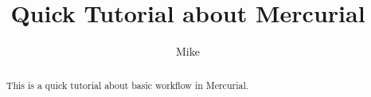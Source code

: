 \documentclass[a4paper,10pt,twocolumn]{article}
\title{Quick Tutorial about Mercurial}
\author{Mike}
\begin{document}
\maketitle

\begin{abstract}
This is a quick tutorial about basic workflow in Mercurial.
\end{abstract}


\end{document}
